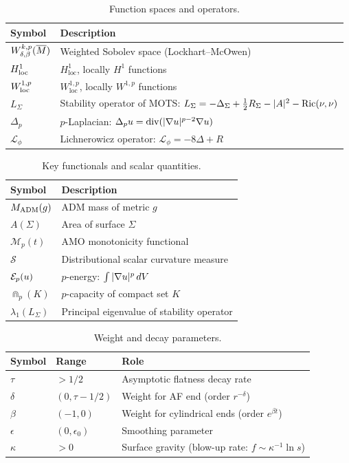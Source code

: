 \begin{table}[ht]
\centering
\caption{Function spaces and operators.}
\begin{tabular}{l l}
\hline
\textbf{Symbol} & \textbf{Description} \\
\hline
$W^{k,p}_{\delta,\beta}(\overline{M})$ & Weighted Sobolev space (Lockhart--McOwen) \\
$H^1_{\text{loc}}$ & $H^1_{\mathrm{loc}}$, locally $H^1$ functions \\
$W^{1,p}_{\text{loc}}$ & $W^{1,p}_{\mathrm{loc}}$, locally $W^{1,p}$ functions \\
$L_\Sigma$ & Stability operator of MOTS: $L_\Sigma = -\Delta_\Sigma + \tfrac{1}{2}R_\Sigma - |A|^2 - \mathrm{Ric}(\nu,\nu)$ \\
$\Delta_p$ & $p$-Laplacian: $\Delta_p u = \mathrm{div}(|\nabla u|^{p-2} \nabla u)$ \\
$\mathcal{L}_\phi$ & Lichnerowicz operator: $\mathcal{L}_\phi = -8\Delta + R$ \\
\hline
\end{tabular}
\end{table}

\begin{table}[ht]
\centering
\caption{Key functionals and scalar quantities.}
\begin{tabular}{l l}
\hline
\textbf{Symbol} & \textbf{Description} \\
\hline
$M_{\mathrm{ADM}}(g)$ & ADM mass of metric $g$ \\
$A(\Sigma)$ & Area of surface $\Sigma$ \\
$\mathcal{M}_p(t)$ & AMO monotonicity functional \\
$\mathcal{S}$ & Distributional scalar curvature measure \\
$\mathcal{E}_p(u)$ & $p$-energy: $\int |\nabla u|^p \,dV$ \\
$\Cap_p(K)$ & $p$-capacity of compact set $K$ \\
$\lambda_1(L_\Sigma)$ & Principal eigenvalue of stability operator \\
\hline
\end{tabular}
\end{table}

\begin{table}[ht]
\centering
\caption{Weight and decay parameters.}
\begin{tabular}{l l l}
\hline
\textbf{Symbol} & \textbf{Range} & \textbf{Role} \\
\hline
$\tau$ & $> 1/2$ & Asymptotic flatness decay rate \\
$\delta$ & $(0, \tau - 1/2)$ & Weight for AF end (order $r^{-\delta}$) \\
$\beta$ & $(-1, 0)$ & Weight for cylindrical ends (order $e^{\beta t}$) \\
$\epsilon$ & $(0, \epsilon_0)$ & Smoothing parameter \\
$\kappa$ & $> 0$ & Surface gravity (blow-up rate: $f \sim \kappa^{-1} \ln s$) \\
\hline
\end{tabular}
\end{table}

